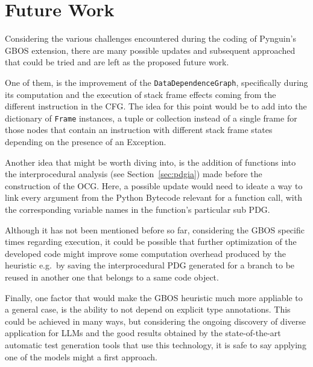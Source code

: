 \documentclass[%
  chapterprefix=false,%
  open=right,%
  twoside=true,%
  paper=a4,%
  logofile={Figures/logo.png},%
  thesistype=master,%
  UKenglish,%
]{se2thesis}
\newcommand{\classname}[1]{\texttt{#1}}
\begin{document}
\section{Future Work}

Considering the various challenges encountered during the coding of Pynguin's GBOS extension, there are many possible updates and subsequent approached that could be tried and are left as the proposed future work.

One of them, is the improvement of the \classname{DataDependenceGraph}, specifically during its computation and the execution of stack frame effects coming from the different instruction in the CFG.\@
The idea for this point would be to add into the dictionary of \classname{Frame} instances, a tuple or collection instead of a single frame for those nodes that contain an instruction with different stack frame states depending on the presence of an Exception.

Another idea that might be worth diving into, is the addition of functions into the interprocedural analysis (see Section~\ref{sec:pdgia}) made before the construction of the OCG.\@
Here, a possible update would need to ideate a way to link every argument from the Python Bytecode relevant for a function call, with the corresponding variable names in the function's particular sub PDG.\@

Although it has not been mentioned before so far, considering the GBOS specific times regarding execution, it could be possible that further optimization of the developed code might improve some computation overhead produced by the heuristic e.g.~by saving the interprocedural PDG generated for a branch to be reused in another one that belongs to a same code object.

Finally, one factor that would make the GBOS heuristic much more appliable to a general case, is the ability to not depend on explicit type annotations.
This could be achieved in many ways, but considering the ongoing discovery of diverse application for LLMs and the good results obtained by the state-of-the-art automatic test generation tools that use this technology, it is safe to say applying one of the models might a first approach.

\backmatter{}

\printbibliography{}
\end{document}
